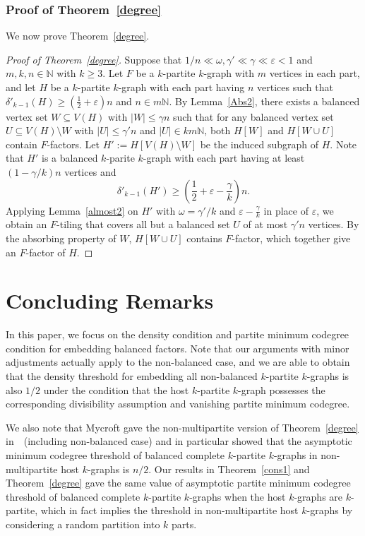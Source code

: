 \documentclass[11pt,a4paper]{article}
\theoremstyle{definition}
\begin{document}
\subsubsection{Proof of Theorem~\ref{degree}}

We now prove Theorem~\ref{degree}.

\begin{proof}[Proof of Theorem~\ref{degree}]
    Suppose that $1/n \ll \omega ,\gamma' \ll \gamma \ll \varepsilon<1$ and $m,k,n\in \mathbb{N}$ with $k\geq 3$. Let $F$ be a $k$-partite $k$-graph with $m$ vertices in each part, and let $H$ be a $k$-partite $k$-graph with each part having $n$ vertices such that $\delta'_{k-1}(H)\geq (\frac{1}{2}+\varepsilon) n$ and $n\in m\mathbb{N}$. By Lemma~\ref{Abs2}, there exists a balanced vertex set $W \subseteq V (H)$ with $|W| \leq \gamma n$ such that for any balanced vertex set $U\subseteq V(H)\setminus W$ with $|U|\leq \gamma' n$ and $|U|\in km\mathbb{N}$, both $H[W]$ and $H[W \cup U]$ contain $F$-factors. Let $H':=H[V(H)\setminus W]$ be the induced subgraph of $H$. Note that $H'$ is a balanced $k$-parite $k$-graph with each part having at least $(1-\gamma/k)n$ vertices and
    $$\delta'_{k-1}(H')\geq (\frac{1}{2}+\varepsilon -\frac{\gamma}{k})n.$$
    Applying Lemma~\ref{almost2} on $H'$ with $\omega =\gamma '/k$ and $\varepsilon -\frac{\gamma}{k}$ in place of $\varepsilon$, we obtain an $F$-tiling that covers all but a balanced set $U$ of at most $\gamma' n$ vertices. By the absorbing property of $W$, $H[W\cup U]$ contains $F$-factor, which together give an $F$-factor of $H$.
\end{proof}

\section{Concluding Remarks}
In this paper, we focus on the density condition and partite minimum codegree condition for embedding balanced factors. Note that our arguments with minor adjustments actually apply to the non-balanced case, and we are able to obtain that the density threshold for embedding all non-balanced $k$-partite $k$-graphs is also $1/2$ under the condition that the host $k$-partite $k$-graph possesses the corresponding divisibility assumption and vanishing partite minimum codegree.

We also note that Mycroft gave the non-multipartite version of Theorem~\ref{degree} in~\cite[Theorem 1.1]{My}~(including non-balanced case) and in particular showed that the asymptotic minimum codegree threshold of balanced complete $k$-partite $k$-graphs in non-multipartite host $k$-graphs is $n/2$. Our results in Theorem~\ref{cons1} and Theorem~\ref{degree} gave the same value of asymptotic partite minimum codegree threshold of balanced complete $k$-partite $k$-graphs when the host $k$-graphs are $k$-partite, which in fact implies the threshold in non-multipartite host $k$-graphs by considering a random partition into $k$ parts.
\end{document}
